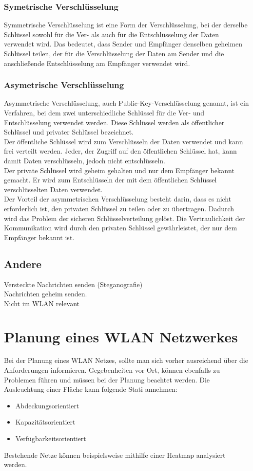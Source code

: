 \documentclass[12pt,a4paper]{article}
\begin{document}
		\subsubsection{Symetrische Verschlüsselung}
			Symmetrische Verschlüsselung ist eine Form der Verschlüsselung, bei der derselbe Schlüssel sowohl für die Ver- als auch für die Entschlüsselung der Daten verwendet wird. Das bedeutet, dass Sender und Empfänger denselben geheimen Schlüssel teilen, der für die Verschlüsselung der Daten am Sender und die anschließende Entschlüsselung am Empfänger verwendet wird.

		\subsubsection{Asymetrische Verschlüsselung}
			Asymmetrische Verschlüsselung, auch Public-Key-Verschlüsselung genannt, ist ein Verfahren, bei dem zwei unterschiedliche Schlüssel für die Ver- und Entschlüsselung verwendet werden. Diese Schlüssel werden als öffentlicher Schlüssel und privater Schlüssel bezeichnet.\\
			Der öffentliche Schlüssel wird zum Verschlüsseln der Daten verwendet und kann frei verteilt werden. Jeder, der Zugriff auf den öffentlichen Schlüssel hat, kann damit Daten verschlüsseln, jedoch nicht entschlüsseln.\\
			Der private Schlüssel wird geheim gehalten und nur dem Empfänger bekannt gemacht. Er wird zum Entschlüsseln der mit dem öffentlichen Schlüssel verschlüsselten Daten verwendet.\\
			Der Vorteil der asymmetrischen Verschlüsselung besteht darin, dass es nicht erforderlich ist, den privaten Schlüssel zu teilen oder zu übertragen. Dadurch wird das Problem der sicheren Schlüsselverteilung gelöst. Die Vertraulichkeit der Kommunikation wird durch den privaten Schlüssel gewährleistet, der nur dem Empfänger bekannt ist.

	\subsection{Andere}
		Versteckte Nachrichten senden (Steganografie)\\
		Nachrichten geheim senden.\\
		Nicht im WLAN relevant

\section{Planung eines WLAN Netzwerkes}
	Bei der Planung	eines WLAN Netzes, sollte man sich vorher ausreichend über die Anforderungen informieren. 
	Gegebenheiten vor Ort, können ebenfalls zu Problemen führen und müssen bei der Planung beachtet werden. 
	Die Ausleuchtung einer Fläche kann folgende Stati annehmen:
	\begin{itemize}
		\item Abdeckungsorientiert
		\item Kapazitätsorientiert 
		\item Verfügbarkeitsorientiert
	\end{itemize}
	Bestehende Netze können beispielsweise mithilfe einer Heatmap analysiert werden. 
\end{document}
